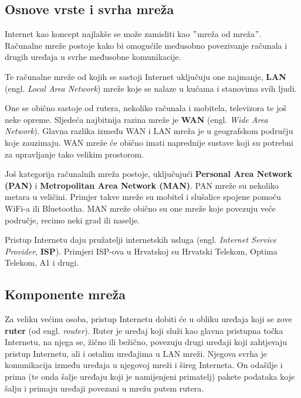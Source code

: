 \subsection{Osnove vrste i svrha mreža}

Internet kao koncept najlakše se može zamisliti kao \("\)mreža od mreža\("\).
Računalne mreže postoje kako bi omogućile međusobno povezivanje računala i drugih uređaja u svrhe međusobne komunikacije.

Te računalne mreže od kojih se sastoji Internet uključuju one najmanje, \textbf{LAN} (engl. \textit{Local Area Network}) mreže koje se nalaze u kućama i stanovima svih ljudi.


One se obično sastoje od rutera, nekoliko računala i mobitela, televizora te još neke opreme.
Sljedeća najbitnija razina mreže je \textbf{WAN} (engl. \textit{Wide Area Network}).
Glavna razlika između WAN i LAN mreža je u geografskom području koje zauzimaju.
WAN mreže će obično imati naprednije sustave koji su potrebni za upravljanje tako velikim prostorom.


Još kategorija računalnih mreža postoje, uključujući \textbf{Personal Area Network (PAN)} i \textbf{Metropolitan Area Network (MAN)}.
PAN mreže su nekoliko metara u veličini.
Primjer takve mreže su mobitel i slušalice spojene pomoću WiFi-a ili Bluetootha.
MAN mreže obično su one mreže koje povezuju veće područje, recimo neki grad ili naselje.

Pristup Internetu daju pružatelji internetskih usluga (engl. \textit{Internet Service Provider}, \textbf{ISP}).
Primjeri ISP-ova u Hrvatskoj su Hrvatski Telekom, Optima Telekom, A1 i drugi.


\subsection{Komponente mreža}

Za veliku većinu osoba, pristup Internetu dobiti će u obliku uređaja koji se zove \textbf{ruter} (od engl. \textit{router}).
Ruter je uređaj koji služi kao glavna pristupna točka Internetu, na njega se, žično ili bežično, povezuju drugi uređaji koji zahtjevaju pristup Internetu, ali i ostalim uređajima u LAN mreži.
Njegova svrha je komunikacija između uređaja u njegovoj mreži i šireg Interneta.
On odašilje i prima (te onda šalje uređaju koji je namijenjeni primatelj) pakete podataka koje šalju i primaju uređaji povezani u mrežu putem rutera.

